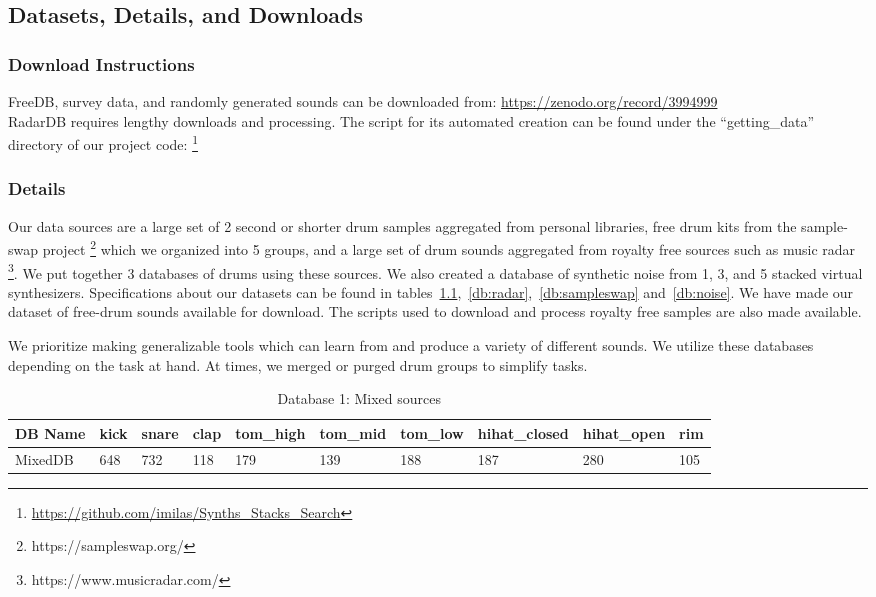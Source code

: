 \documentclass[runningheads,a4paper]{llncs}
\begin{document}
\begin{appendices}
\chapter{Datasets, Details, and Downloads}
\label{appendix:datasets}
\subsection{Download Instructions}
FreeDB, survey data, and randomly generated sounds can be downloaded from: \url{https://zenodo.org/record/3994999}\\
RadarDB requires lengthy downloads and processing. The script for its automated creation can be found under the \enquote{getting\_data} directory of our project code: \footnote{\url{https://github.com/imilas/Synths_Stacks_Search}}
\subsection{Details}
Our data sources are a large set of 2 second or shorter drum samples aggregated from personal libraries, free drum kits from the sample-swap project \footnote{https://sampleswap.org/} which we organized into 5 groups, and a large set of drum sounds aggregated from royalty free sources such as music radar \footnote{https://www.musicradar.com/}. We put together 3 databases of drums using these sources. We also created a database of synthetic noise from 1, 3, and 5 stacked virtual synthesizers. Specifications about our datasets can be found in tables~\ref{db:self},~\ref{db:radar},~\ref{db:sampleswap} and~\ref{db:noise}. We have made our dataset of free-drum sounds available for download. The scripts used to download and process royalty free samples are also made available. 

We prioritize making generalizable tools which can learn from and produce a variety of different sounds. We utilize these databases depending on the task at hand. At times, we merged or purged drum groups to simplify tasks.
\begin{table}[]
\centering
\begin{tabular}[width=\paperwidth]{|l|l|l|l|l|l|l|l|l|l|}
\hline
DB Name & kick & snare & clap & tom\_high & tom\_mid & tom\_low & hihat\_closed &  hihat\_open & rim \\ \hline
MixedDB & 648 & 732 & 118 & 179 & 139 &  188 & 187 & 280 & 105 \\\hline
\end{tabular}
\caption{Database 1: Mixed sources}
\label{db:self}
\end{table}


\end{appendices}
\end{document}
